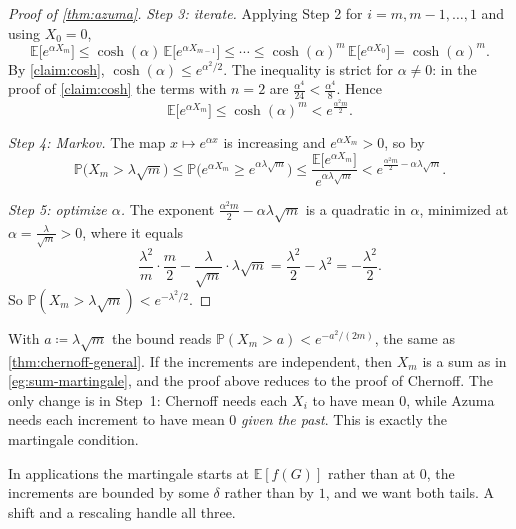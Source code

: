 \begin{proof}[Proof of \autoref{thm:azuma}]
    \emph{Step 3: iterate.} Applying Step 2 for \(i = m, m-1, \ldots, 1\) and using \(X_{0} = 0\),
    \[
        \mathbb{E}\bigl[ e^{\alpha X_{m}} \bigr]
        \le \cosh(\alpha) \, \mathbb{E}\bigl[ e^{\alpha X_{m-1}} \bigr]
        \le \cdots
        \le \cosh(\alpha)^{m} \, \mathbb{E}\bigl[ e^{\alpha X_{0}} \bigr]
        = \cosh(\alpha)^{m} .
    \]
    By \autoref{claim:cosh}, \(\cosh(\alpha) \le e^{\alpha^{2}/2}\). The inequality is strict for \(\alpha \ne 0\): in the proof of \autoref{claim:cosh} the terms with \(n = 2\) are \(\frac{\alpha^{4}}{24} < \frac{\alpha^{4}}{8}\). Hence
    \[
        \mathbb{E}\bigl[ e^{\alpha X_{m}} \bigr] \le \cosh(\alpha)^{m} < e^{\frac{\alpha^{2} m}{2}} .
    \]

    \emph{Step 4: Markov.} The map \(x \mapsto e^{\alpha x}\) is increasing and \(e^{\alpha X_{m}} > 0\), so by 
    \[
        \mathbb{P}\bigl( X_{m} > \lambda \sqrt{m} \bigr)
        \le \mathbb{P}\bigl( e^{\alpha X_{m}} \ge e^{\alpha \lambda \sqrt{m}} \bigr)
        \le \frac{\mathbb{E}\bigl[ e^{\alpha X_{m}} \bigr]}{e^{\alpha \lambda \sqrt{m}}}
        < e^{\frac{\alpha^{2} m}{2} - \alpha \lambda \sqrt{m}} .
    \]

    \emph{Step 5: optimize \(\alpha\).} The exponent \(\frac{\alpha^{2} m}{2} - \alpha \lambda \sqrt{m}\) is a quadratic in \(\alpha\), minimized at \(\alpha = \frac{\lambda}{\sqrt{m}} > 0\), where it equals
    \[
        \frac{\lambda^{2}}{m} \cdot \frac{m}{2} - \frac{\lambda}{\sqrt{m}} \cdot \lambda \sqrt{m} = \frac{\lambda^{2}}{2} - \lambda^{2} = -\frac{\lambda^{2}}{2} .
    \]
    So \(\mathbb{P}(X_{m} > \lambda \sqrt{m}) < e^{-\lambda^{2}/2}\).
\end{proof}

\begin{remark}\label{rmk:azuma-vs-chernoff}
    With \(a \coloneqq \lambda \sqrt{m}\) the bound reads \(\mathbb{P}(X_{m} > a) < e^{-a^{2}/(2m)}\), the same as \autoref{thm:chernoff-general}. If the increments are independent, then \(X_{m}\) is a sum as in \autoref{eg:sum-martingale}, and the proof above reduces to the proof of Chernoff. The only change is in Step~1: Chernoff needs each \(X_{i}\) to have mean \(0\), while Azuma needs each increment to have mean \(0\) \emph{given the past}. This is exactly the martingale condition.
\end{remark}

In applications the martingale starts at \(\mathbb{E}[f(G)]\) rather than at \(0\), the increments are bounded by some \(\delta\) rather than by \(1\), and we want both tails. A shift and a rescaling handle all three.

